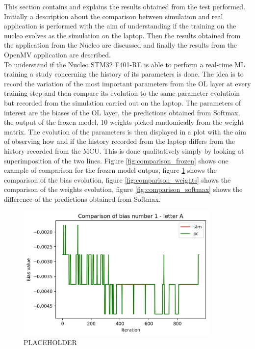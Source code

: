 \documentclass[12pt]{report}
\begin{document}
This section contains and explains the results obtained from the test performed. Initially a description about the comparison between simulation and real application is performed with the aim of understanding if the training on the nucleo evolves as the simulation on the laptop. Then the results obtained from the application from the Nucleo are discussed and finally the results from the OpenMV application are described.\\
To understand if the Nucleo STM32 F401-RE is able to perform a real-time ML training a study concerning the history of its parameters is done. The idea is to record the variation of the most important parameters from the OL layer at every training step and then compare its evolution to the same parameter evolutioin but recorded from the simulation carried out on the laptop. The parameters of interest are the biases of the OL layer, the predictions obtained from Softmax, the output of the frozen model, 10 weights picked randomically from the weight matrix. The evolution of the parameters is then displayed in a plot with the aim of observing how and if the history recorded from the laptop differs from the history recorded from the MCU. This is done qualitatively simply by looking at superimposition of the two lines. Figure \ref{fig:comparison_frozen} shows one example of comparison for the frozen model outpus, figure \ref{fig:comparison_bias} shows the comparison of the bias evolution, figure \ref{fig:comparison_weights} shows the comparison of the weights evolution, figure \ref{fig:comparison_softmax} shows the difference of the predictions obtained from Softmax.
%
\begin{figure}[h!]
    \centering
    \includegraphics[width=100mm]{Figures/Chapter5/bias_example.png} 
    \caption{PLACEHOLDER}
    \label{fig:comparison_bias}    
\end{figure}
%
%
\end{document}
